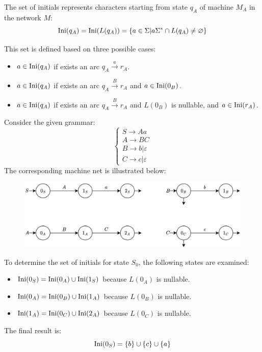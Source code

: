 \begin{definition}
    The set of initials represents characters starting from state $q_A$ of machine $M_A$ in the network $M$: 
    \[\textnormal{Ini}(q_A)=\textnormal{Ini}(L(q_A))=\{a \in \Sigma|a\Sigma^{*}\cap L(q_A) \neq \varnothing\}\]
\end{definition}
This set is defined based on three possible cases:
\begin{itemize}
    \item $a \in \textnormal{Ini}(q_A)$ if exists an arc $q_A \overset{a}{\rightarrow}r_A$. 
    \item $a \in \textnormal{Ini}(q_A)$ if exists an arc $q_A \overset{B}{\rightarrow}r_A$ and $a \in \textnormal{Ini}(0_B)$. 
    \item $a \in \textnormal{Ini}(q_A)$ if exists an arc $q_A \overset{B}{\rightarrow}r_A$ and $L(0_B)$ is nullable, and $a \in \textnormal{Ini}(r_A)$.
\end{itemize}
\begin{example}
    Consider the given grammar:
    \[\begin{cases}
        S \rightarrow Aa \\
        A \rightarrow BC \\
        B \rightarrow b|\varepsilon \\
        C \rightarrow c|\varepsilon
    \end{cases}\]
    The corresponding machine net is illustrated below:
    \begin{figure}[H]
        \centering
        \includegraphics[width=0.75\linewidth]{images/net1.png}
    \end{figure}
    To determine the set of initials for state $S_0$, the following states are examined:
    \begin{itemize}
        \item $\textnormal{Ini}(0_S)=\textnormal{Ini}(0_A) \cup \textnormal{Ini}(1_S)$ because $L(0_A)$ is nullable. 
        \item $\textnormal{Ini}(0_A)=\textnormal{Ini}(0_B) \cup \textnormal{Ini}(1_A)$ because $L(0_B)$ is nullable. 
        \item $\textnormal{Ini}(1_A)=\textnormal{Ini}(0_C) \cup \textnormal{Ini}(2_A)$ because $L(0_C)$ is nullable. 
    \end{itemize}
    The final result is: 
    \[\textnormal{Ini}(0_S)=\{b\} \cup \{c\} \cup \{a\}\]
\end{example}
